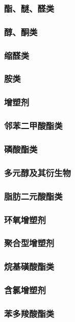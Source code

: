 \documentclass[UTF8]{../../ApplicationUniverse}
\begin{document}
        \subsubsection{酯、醚、醛类}
        \subsubsection{醇、酮类}
        \subsubsection{缩醛类}
        \subsubsection{胺类}
\subsubsection{增塑剂}
    \subsubsection{邻苯二甲酸酯类}
    \subsubsection{磷酸酯类}
    \subsubsection{多元醇及其衍生物}
    \subsubsection{脂肪二元酸酯类}
    \subsubsection{环氧增塑剂}
    \subsubsection{聚合型增塑剂}
    \subsubsection{烷基磺酸酯类}
    \subsubsection{含氯增塑剂}
        \subsubsection{苯多羧酸酯类}
\end{document}
